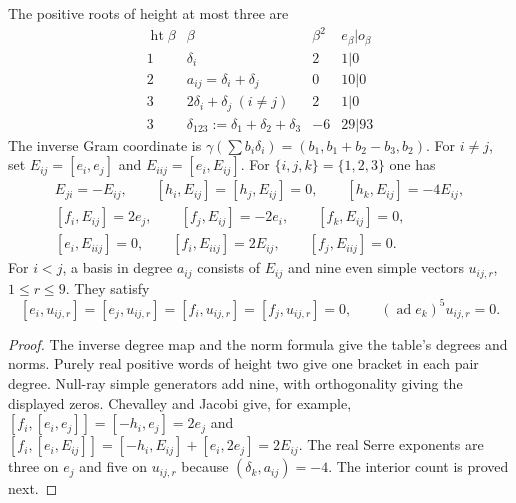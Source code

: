\begin{proposition}
\label{prop:bkm-low-degree-denominator-brackets}
The positive roots of height at most three are
\begin{equation}
\label{eq:bkm-height-three-table}
\begin{array}{c|c|c|c}
 \operatorname{ht}\beta&\beta&\beta^2&e_\beta|o_\beta\\\hline
 1&\delta_i&2&1|0\\
 2&a_{ij}=\delta_i+\delta_j&0&10|0\\
 3&2\delta_i+\delta_j\ (i\ne j)&2&1|0\\
 3&\delta_{123}:=\delta_1+\delta_2+\delta_3&-6&29|93
\end{array}
\end{equation}
The inverse Gram coordinate is
$\gamma(\sum b_i\delta_i)=(b_1,b_1+b_2-b_3,b_2)$.
For $i\ne j$, set $E_{ij}=[e_i,e_j]$ and
$E_{iij}=[e_i,E_{ij}]$. For $\{i,j,k\}=\{1,2,3\}$ one has
\begin{gather*}
 E_{ji}=-E_{ij},\qquad
 [h_i,E_{ij}]=[h_j,E_{ij}]=0,\qquad [h_k,E_{ij}]=-4E_{ij},\\
 [f_i,E_{ij}]=2e_j,\qquad [f_j,E_{ij}]=-2e_i,\qquad [f_k,E_{ij}]=0,\\
 [e_i,E_{iij}]=0,\qquad [f_i,E_{iij}]=2E_{ij},\qquad
 [f_j,E_{iij}]=0.
\end{gather*}
For $i<j$, a basis in degree $a_{ij}$ consists of $E_{ij}$ and
nine even simple vectors $u_{ij,r}$, $1\leq r\leq9$.
They satisfy
\[
 [e_i,u_{ij,r}]=[e_j,u_{ij,r}]
 =[f_i,u_{ij,r}]=[f_j,u_{ij,r}]=0,
 \qquad (\operatorname{ad}e_k)^5u_{ij,r}=0.
\]
\end{proposition}
\begin{proof}
The inverse degree map and the norm formula give the table's degrees
and norms. Purely real positive words of height two give one bracket
in each pair degree. Null-ray simple generators add nine, with
orthogonality giving the displayed zeros. Chevalley and Jacobi give,
for example,
$[f_i,[e_i,e_j]]=[-h_i,e_j]=2e_j$ and
$[f_i,[e_i,E_{ij}]]=[-h_i,E_{ij}]+[e_i,2e_j]=2E_{ij}$.
The real Serre exponents are three on $e_j$ and five on $u_{ij,r}$
because $(\delta_k,a_{ij})=-4$. The interior count is proved next.
\end{proof}

